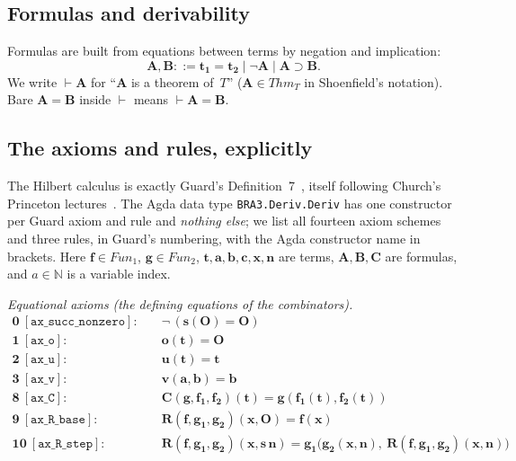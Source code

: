 \documentclass[11pt]{article}
\theoremstyle{plain}
\theoremstyle{definition}
\theoremstyle{remark}
\newcommand{\Fun}{\mathit{Fun}}
\newcommand{\Thmm}{\mathit{Thm}}
\begin{document}
\subsection{Formulas and derivability}

Formulas are built from equations between terms by negation and
implication:
\[
\mathbf{A}, \mathbf{B} ::= \mathbf{t_1} = \mathbf{t_2} \mid \neg \mathbf{A} \mid \mathbf{A} \supset \mathbf{B}.
\]
We write $\vdash \mathbf{A}$ for ``$\mathbf{A}$ is a theorem of~$T$''
($\mathbf{A} \in \Thmm_T$ in Shoenfield's notation).  Bare $\mathbf{A}
= \mathbf{B}$ inside $\vdash$ means $\vdash \mathbf{A} = \mathbf{B}$.

\subsection{The axioms and rules, explicitly}
\label{sec:axioms}

The Hilbert calculus is exactly Guard's Definition~7~\cite{Guard1963},
itself following Church's Princeton lectures~\cite{Church}.  The Agda
data type \verb|BRA3.Deriv.Deriv| has one constructor per Guard axiom and
rule and \emph{nothing else}; we list all fourteen axiom schemes and
three rules, in Guard's numbering, with the Agda constructor name in
brackets.  Here $\mathbf{f} \in \Fun_1$, $\mathbf{g} \in \Fun_2$,
$\mathbf{t},\mathbf{a},\mathbf{b},\mathbf{c},\mathbf{x},\mathbf{n}$ are
terms, $\mathbf{A},\mathbf{B},\mathbf{C}$ are formulas, and $a \in
\mathbb{N}$ is a variable index.

\medskip
\noindent\emph{Equational axioms (the defining equations of the
combinators).}
\begin{align*}
\textbf{0}\ [\mathtt{ax\_succ\_nonzero}]:\quad & \neg\,(\mathbf{s}(\mathbf{O}) = \mathbf{O}) \\
\textbf{1}\ [\mathtt{ax\_o}]:\quad & \mathbf{o}(\mathbf{t}) = \mathbf{O} \\
\textbf{2}\ [\mathtt{ax\_u}]:\quad & \mathbf{u}(\mathbf{t}) = \mathbf{t} \\
\textbf{3}\ [\mathtt{ax\_v}]:\quad & \mathbf{v}(\mathbf{a},\mathbf{b}) = \mathbf{b} \\
\textbf{8}\ [\mathtt{ax\_C}]:\quad & \mathbf{C}(\mathbf{g},\mathbf{f_1},\mathbf{f_2})(\mathbf{t}) = \mathbf{g}(\mathbf{f_1}(\mathbf{t}), \mathbf{f_2}(\mathbf{t})) \\
\textbf{9}\ [\mathtt{ax\_R\_base}]:\quad & \mathbf{R}(\mathbf{f},\mathbf{g_1},\mathbf{g_2})(\mathbf{x}, \mathbf{O}) = \mathbf{f}(\mathbf{x}) \\
\textbf{10}\ [\mathtt{ax\_R\_step}]:\quad & \mathbf{R}(\mathbf{f},\mathbf{g_1},\mathbf{g_2})(\mathbf{x}, \mathbf{s}\,\mathbf{n}) = \mathbf{g_1}\bigl(\mathbf{g_2}(\mathbf{x},\mathbf{n}),\ \mathbf{R}(\mathbf{f},\mathbf{g_1},\mathbf{g_2})(\mathbf{x},\mathbf{n})\bigr)
\end{align*}
\end{document}
